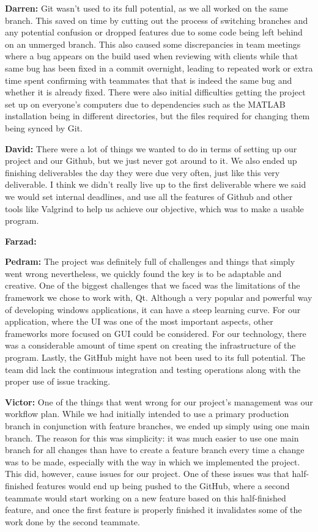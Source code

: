 \documentclass{article}
\begin{document}
\textbf{Darren:} Git wasn't used to its full potential, as we all worked on the same branch. This saved on time by cutting out the process of switching branches and any potential confusion or dropped features due to some code being left behind on an unmerged branch. This also caused some discrepancies in team meetings where a bug appears on the build used when reviewing with clients while that same bug has been fixed in a commit overnight, leading to repeated work or extra time spent confirming with teammates that that is indeed the same bug and whether it is already fixed. There were also initial difficulties getting the project set up on everyone's computers due to dependencies such as the MATLAB installation being in different directories, but the files required for changing them being synced by Git.

\textbf{David:} There were a lot of things we wanted to do in terms of setting up our project and our Github, but we 
just never got around to it. We also ended up finishing deliverables the day they were due very often, just like this 
very deliverable. I think we didn't really live up to the first deliverable where we said we would set internal 
deadlines, and use all the features of Github and other tools like Valgrind to help us achieve our objective, which was 
to make a usable program. 

\textbf{Farzad:}

\textbf{Pedram:} The project was definitely full of challenges and things that simply went wrong nevertheless, we quickly found the key is to be adaptable and creative. One of the biggest challenges that we faced was the limitations of the framework we chose to work with, Qt. Although a very popular and powerful way of developing windows applications, it can have a steep learning curve. For our application, where the UI was one of the most important aspects, other frameworks more focused on GUI could be considered. For our technology, there was a considerable amount of time spent on creating the infrastructure of the program. Lastly, the GitHub might have not been used to its full potential. The team did lack the continuous integration and testing operations along with the proper use of issue tracking. 

\textbf{Victor:} One of the things that went wrong for our project's management was our workflow plan. While we had initially intended to use a primary production branch in 
conjunction with feature branches, we ended up simply using one main branch. The reason for this was simplicity: it was much easier to use one main branch for all changes than
have to create a feature branch every time a change was to be made, especially with the way in which we implemented the project. This did, however, cause issues for our project.
One of these issues was that half-finished features would end up being pushed to the GitHub, where a second teammate would start working on a new feature based on this 
half-finished feature, and once the first feature is properly finished it invalidates some of the work done by the second teammate.
\end{document}
